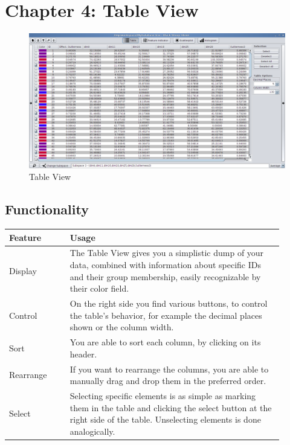
\section{\color{fancy}Chapter 4: Table View}

\begin{figure}[h]
  \centering
  \includegraphics[width=16cm]{images/bsv/TableView.png}
  \caption{Table View}
  \label{fig:tableview}
\end{figure}

\subsection{Functionality}
\begin{tabular}{p{0.2\linewidth}p{0.7\linewidth}}
  \color{fancy}Feature & \color{fancy}Usage \\ \hline
  Display & The Table View gives you a simplistic dump of your data, combined with information about specific IDs and their group membership, easily recognizable by their color field. \\ \hline
  Control & On the right side you find various buttons, to control the table's behavior, for example the decimal places shown or the column width. \\ \hline
  Sort & You are able to sort each column, by clicking on its header. \\ \hline
  Rearrange & If you want to rearrange the columns, you are able to manually drag and drop them in the preferred order. \\ \hline
  Select & Selecting specific elements is as simple as marking them in the table and clicking the select button at the right side of the table. Unselecting elements is done analogically. \\ \hline
\end{tabular}

